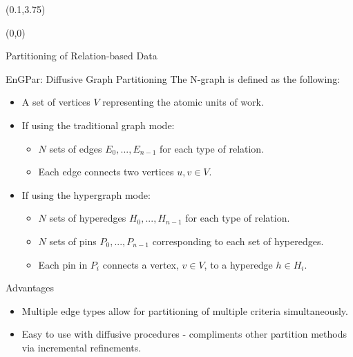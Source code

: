 \documentclass{beamer}
\begin{document}
\begin{textblock}{15.6}(0.1,3.75)
  \begin{textblock}{5}(0,0)
    \begin{block}{\centering Partitioning of Relation-based Data}
       
    \end{block}
    \begin{block}{\centering EnGPar: Diffusive Graph Partitioning}
      The N-graph is defined as the following:
      \begin{itemize}
      \item A set of vertices $V$ representing the atomic units of work.
      \item If using the traditional graph mode:
        \begin{itemize}
        \item $N$ sets of edges $E_0,...,E_{n-1}$ for each type of relation.
        \item Each edge connects two vertices $u,v \in V$.
        \end{itemize}
      \item If using the hypergraph mode:
        \begin{itemize}
        \item $N$ sets of hyperedges $H_0,...,H_{n-1}$ for each type of relation.
        \item $N$ sets of pins $P_0,...,P_{n-1}$ corresponding to each set of hyperedges.
        \item Each pin in $P_i$ connects a vertex, $v \in V$, to a hyperedge $h \in H_i$.
        \end{itemize}
      \end{itemize}

      Advantages
      \begin{itemize}
      \item Multiple edge types allow for partitioning of multiple criteria simultaneously.
      \item Easy to use with diffusive procedures - compliments other partition methods via incremental refinements.
      \end{itemize}
      

\end{block}
\end{textblock}
\end{textblock}
\end{document}
